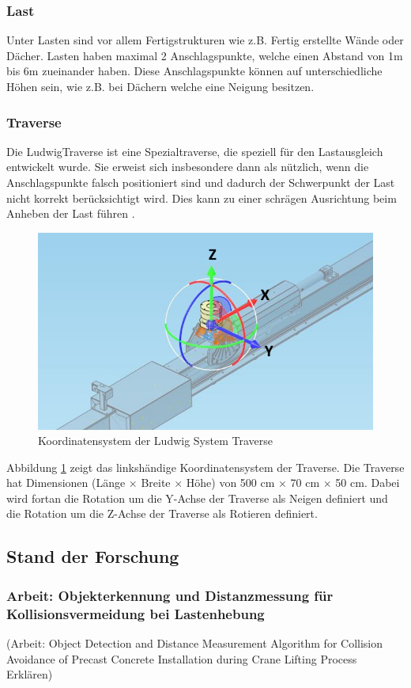 \subsubsection{Last}
Unter Lasten sind vor allem Fertigstrukturen wie z.B. Fertig erstellte Wände oder Dächer. 
Lasten haben maximal 2 Anschlagspunkte, welche einen Abstand von 1m bis 6m zueinander haben.
Diese Anschlagspunkte können auf unterschiedliche Höhen sein, wie z.B. bei Dächern welche eine
Neigung besitzen.

\clearpage
\subsubsection{Traverse}
Die LudwigTraverse ist eine Spezialtraverse, die speziell für den Lastausgleich entwickelt 
wurde. Sie erweist sich insbesondere dann als nützlich, wenn die Anschlagspunkte 
falsch positioniert sind und dadurch der Schwerpunkt der Last nicht korrekt berücksichtigt wird. 
Dies kann zu einer schrägen Ausrichtung beim Anheben der Last führen \cite{ludwigTraverse}.

\begin{figure}[H]
    \centering
    \includegraphics[width=0.5\linewidth]{graphics/Traverse_Rotationen.PNG}
    \caption{Koordinatensystem der Ludwig System Traverse}
    \label{fig:traverse}
\end{figure}

Abbildung \ref{fig:traverse} zeigt das linkshändige Koordinatensystem der Traverse.
Die Traverse hat Dimensionen (Länge × Breite × Höhe) von 500 cm × 70 cm × 50 cm.
Dabei wird fortan die Rotation um die Y-Achse der Traverse als Neigen definiert und die Rotation 
um die Z-Achse der Traverse als Rotieren definiert.

\subsection{Stand der Forschung}

\subsubsection{Arbeit: Objekterkennung und Distanzmessung für Kollisionsvermeidung bei Lastenhebung}
(Arbeit: Object Detection and Distance Measurement Algorithm for Collision Avoidance of Precast Concrete Installation during Crane Lifting Process\cite{yong_object_2023} Erklären)

